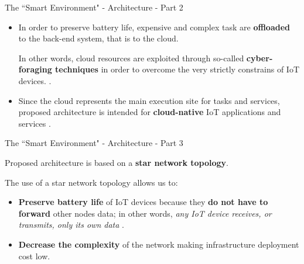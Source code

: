\documentclass[13.5pt]{beamer}
\begin{document}
\begin{frame}{The ``Smart Environment" - Architecture - Part 2}

\begin{itemize}
\justifying
\item In order to preserve battery life, expensive and complex task are \textbf{offloaded} to the back-end system, that is to the cloud. 

In other words, cloud resources are exploited through so-called \textbf{cyber-foraging techniques} in order to overcome the very strictly constrains of IoT devices. \cite{TheSeminalRoleEdgeNativeApplications}. 

\item Since the cloud represents the main execution site for tasks and services, proposed architecture is intended for \textbf{cloud-native} IoT applications and services \cite{TheSeminalRoleEdgeNativeApplications}.

\end{itemize}

\end{frame} 
\begin{frame}{The ``Smart Environment" - Architecture - Part 3}

\begin{block}{}
Proposed architecture is based on a \textbf{star network topology}.
\end{block}

The use of a star network topology allows us to:

\begin{itemize}
\justifying
\item \textbf{Preserve battery life} of IoT devices because they \textbf{do not have to forward} other nodes data; in other words, \textit{any IoT device receives, or transmits, only its own data} \cite{LoRaWAN}.

\item \textbf{Decrease the complexity} of the network \cite{LoRaWAN} making infrastructure deployment cost low.

\end{itemize}

\end{frame} 
\end{document}
